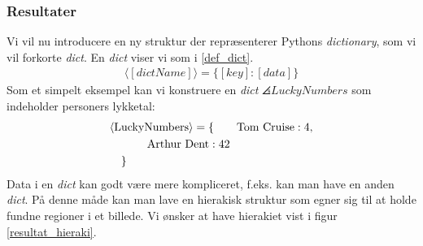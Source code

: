 {%
%

\subsubsection{Resultater}
Vi vil nu introducere en ny struktur der repræsenterer Pythons
\emph{dictionary}, som vi vil forkorte \emph{dict}.
En \emph{dict} viser vi som i \ref{def_dict}.
\begin{eqnarray}
    \langle[\textit{dictName}]\rangle = \{ [\textit{key}] : [\textit{data}] \}
    \label{def_dict}
\end{eqnarray}
Som et simpelt eksempel kan vi konstruere en \emph{dict}
$\angles{LuckyNumbers}$ som indeholder personers lykketal:
\begin{multline}
    \angles{LuckyNumbers} = \{ \qquad \textrm{Tom Cruise} : 4 , \\
    \textrm{Arthur Dent} : 42 \qquad\qquad\\
    \shoveleft{\}}\shoveright{}
    \label{lucky_dict}
\end{multline}
Data i en \emph{dict} kan godt være mere kompliceret, f.eks. kan man
have en anden \emph{dict}. På denne måde kan man lave en hierakisk
struktur som egner sig til at holde fundne regioner i et billede. Vi
ønsker at have hierakiet vist i figur \ref{resultat_hieraki}.

}
